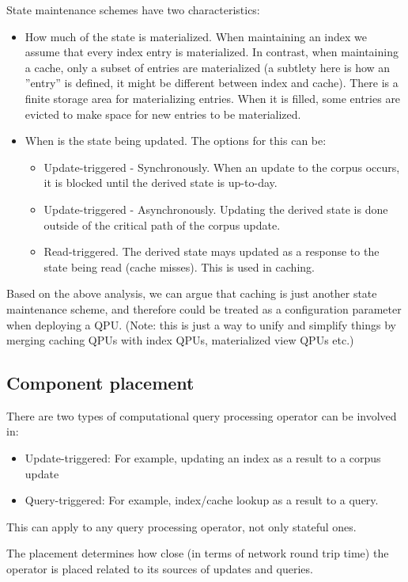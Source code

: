 State maintenance schemes have two characteristics:
\begin{itemize}
  \item How much of the state is materialized.
  When maintaining an index we assume that every index entry is materialized.
  In contrast, when maintaining a cache, only a subset of entries are
  materialized
  (a subtlety here is how an ''entry'' is defined, it might be different between
  index and cache).
  There is a finite storage area for materializing entries.
  When it is filled, some entries are evicted to make space for new entries to
  be materialized.
  \item When is the state being updated.
  The options for this can be:
  \begin{itemize}
    \item Update-triggered - Synchronously. When an update to the corpus
    occurs, it is blocked until the derived state is up-to-day.
    \item Update-triggered - Asynchronously. Updating the derived state is done
    outside of the critical path of the corpus update.
    \item Read-triggered. The derived state mays updated as a response to the
    state being read (cache misses).
    This is used in caching.
  \end{itemize}
\end{itemize}
  Based on the above analysis, we can argue that caching is just another state
  maintenance scheme, and therefore could be treated as a configuration
  parameter when deploying a QPU.
  (Note: this is just a way to unify and simplify things by merging caching
  QPUs with index QPUs, materialized view QPUs etc.)

\subsection{Component placement}
There are two types of computational query processing operator can be
involved in:
\begin{itemize}
  \item Update-triggered: For example, updating an index as a result to a corpus
  update
  \item Query-triggered: For example, index/cache lookup as a result to a query.
\end{itemize}
This can apply to any query processing operator, not only stateful ones.

The placement determines how close (in terms of network round trip time) the
operator is placed related to its sources of updates and queries.

